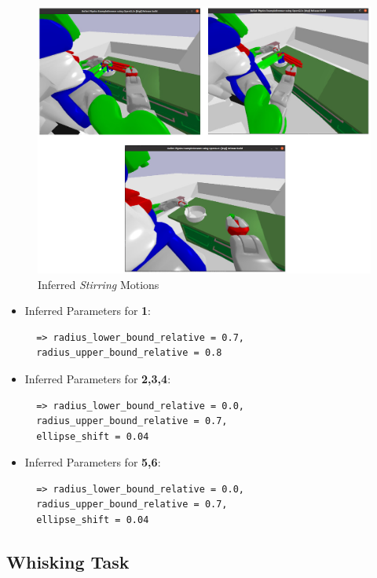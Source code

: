 \begin{figure}[H]
  \centering
  \includegraphics[scale=0.36]{Graphics/stirring_evaluation.jpg}
  \caption{Inferred \textit{Stirring} Motions}
  \label{fig:mixingverb WikiHow}
\end{figure}

\begin{itemize}
\item Inferred Parameters for \textbf{1}: 
 \begin{lstlisting}
  => radius_lower_bound_relative = 0.7, 
  radius_upper_bound_relative = 0.8
\end{lstlisting}
\item Inferred Parameters for \textbf{2,3,4}:
\begin{lstlisting}
  => radius_lower_bound_relative = 0.0, 
  radius_upper_bound_relative = 0.7,
  ellipse_shift = 0.04
\end{lstlisting}
\item Inferred Parameters for \textbf{5,6}:
\begin{lstlisting}
  => radius_lower_bound_relative = 0.0, 
  radius_upper_bound_relative = 0.7,
  ellipse_shift = 0.04
\end{lstlisting}
\end{itemize}

\subsection*{Whisking Task}

